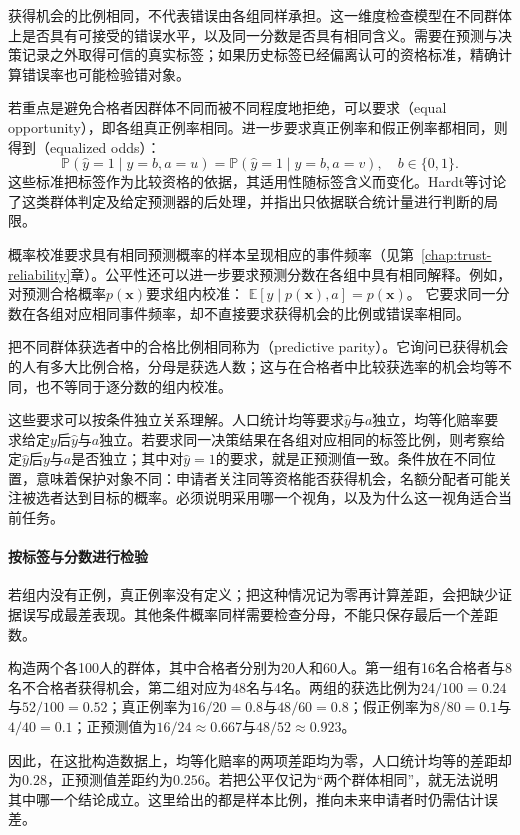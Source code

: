获得机会的比例相同，不代表错误由各组同样承担。这一维度检查模型在不同群体上是否具有可接受的错误水平，以及同一分数是否具有相同含义。需要在预测与决策记录之外取得可信的真实标签；如果历史标签已经偏离认可的资格标准，精确计算错误率也可能检验错对象。

若重点是避免合格者因群体不同而被不同程度地拒绝，可以要求（equal opportunity），即各组真正例率相同。进一步要求真正例率和假正例率都相同，则得到（equalized odds）：
\begin{equation}
 \mathbb P(\hat y=1\mid y=b,a=u)
 =\mathbb P(\hat y=1\mid y=b,a=v),
 \quad b\in\{0,1\}.
 \label{eq:fairness-equalized-odds}
\end{equation}
这些标准把标签作为比较资格的依据，其适用性随标签含义而变化。Hardt等讨论了这类群体判定及给定预测器的后处理，并指出只依据联合统计量进行判断的局限。

概率校准要求具有相同预测概率的样本呈现相应的事件频率（见第~\ref{chap:trust-reliability}章）。公平性还可以进一步要求预测分数在各组中具有相同解释。例如，对预测合格概率$p(\bm{x})$要求组内校准：
$\mathbb E[y\mid p(\bm{x}),a]=p(\bm{x})$。
它要求同一分数在各组对应相同事件频率，却不直接要求获得机会的比例或错误率相同。

把不同群体获选者中的合格比例相同称为（predictive parity）。它询问已获得机会的人有多大比例合格，分母是获选人数；这与在合格者中比较获选率的机会均等不同，也不等同于逐分数的组内校准。

这些要求可以按条件独立关系理解。人口统计均等要求$\hat y$与$a$独立，均等化赔率要求给定$y$后$\hat y$与$a$独立。若要求同一决策结果在各组对应相同的标签比例，则考察给定$\hat y$后$y$与$a$是否独立；其中对$\hat y=1$的要求，就是正预测值一致。条件放在不同位置，意味着保护对象不同：申请者关注同等资格能否获得机会，名额分配者可能关注被选者达到目标的概率。必须说明采用哪一个视角，以及为什么这一视角适合当前任务。

\paragraph{按标签与分数进行检验}

若组内没有正例，真正例率没有定义；把这种情况记为零再计算差距，会把缺少证据误写成最差表现。其他条件概率同样需要检查分母，不能只保存最后一个差距数。

\begin{example}[同一批申请者上的不同公平指标]
\label{ex:fairness-rates}
构造两个各100人的群体，其中合格者分别为20人和60人。第一组有16名合格者与8名不合格者获得机会，第二组对应为48名与4名。两组的获选比例为$24/100=0.24$与$52/100=0.52$；真正例率为$16/20=0.8$与$48/60=0.8$；假正例率为$8/80=0.1$与$4/40=0.1$；正预测值为$16/24\approx0.667$与$48/52\approx0.923$。

因此，在这批构造数据上，均等化赔率的两项差距均为零，人口统计均等的差距却为$0.28$，正预测值差距约为$0.256$。若把公平仅记为“两个群体相同”，就无法说明其中哪一个结论成立。这里给出的都是样本比例，推向未来申请者时仍需估计误差。
\end{example}

